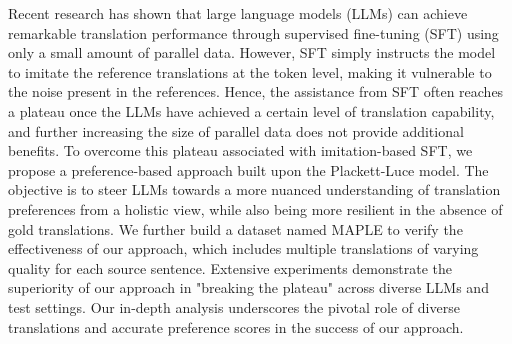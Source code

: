 Recent research has shown that large language models (LLMs) can achieve remarkable translation performance through supervised fine-tuning (SFT) using only a small amount of parallel data. However, SFT simply instructs the model to imitate the reference translations at the token level, making it vulnerable to the noise present in the references. Hence, the assistance from SFT often reaches a plateau once the LLMs have achieved a certain level of translation capability, and further increasing the size of parallel data does not provide additional benefits. To overcome this plateau associated with imitation-based SFT, we propose a preference-based approach built upon the Plackett-Luce model. The objective is to steer LLMs towards a more nuanced understanding of translation preferences from a holistic view, while also being more resilient in the absence of gold translations. We further build a dataset named MAPLE to verify the effectiveness of our approach, which includes multiple translations of varying quality for each source sentence. Extensive experiments demonstrate the superiority of our approach in "breaking the plateau" across diverse LLMs and test settings. Our in-depth analysis underscores the pivotal role of diverse translations and accurate preference scores in the success of our approach.